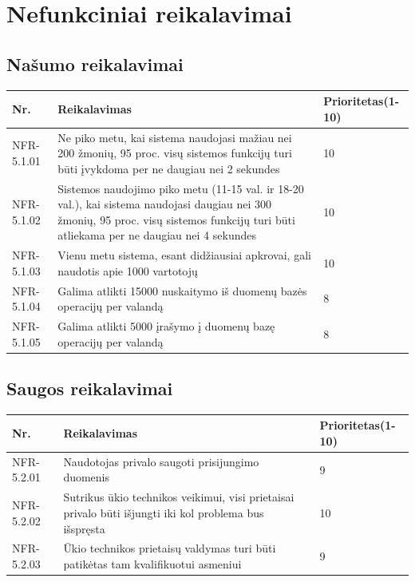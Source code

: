 \documentclass[oneside]{VUMIFPSkursinis}
\begin{document}
\section{Nefunkciniai reikalavimai}
\subsection{Našumo reikalavimai}
\begin{table}[htbp]
	\begin{tabularx}{1\textwidth}{ |P{2.5cm}|X|P{3cm }| }  \hline
		Nr. & Reikalavimas & Prioritetas(1-10) \\ \hline
		NFR-5.1.01 & Ne piko metu, kai sistema naudojasi mažiau nei 200 žmonių, 95 proc. visų sistemos funkcijų turi būti įvykdoma per ne daugiau nei 2 sekundes & 10 \\ \hline
		NFR-5.1.02 & Sistemos naudojimo piko metu (11-15 val. ir 18-20 val.), kai sistema naudojasi daugiau nei 300 žmonių, 95 proc. visų sistemos funkcijų turi būti atliekama per ne daugiau nei 4 sekundes & 10 \\ \hline
		NFR-5.1.03 & Vienu metu sistema, esant didžiausiai apkrovai, gali naudotis apie 1000 vartotojų & 10 \\ \hline
		NFR-5.1.04 & Galima atlikti 15000 nuskaitymo iš duomenų bazės operacijų per valandą & 8 \\ \hline
		NFR-5.1.05 & Galima atlikti 5000 įrašymo į duomenų bazę operacijų per valandą  & 8 \\ \hline
	\end{tabularx}
\end{table}
\subsection{Saugos reikalavimai}
\begin{table}[htbp]
	\begin{tabularx}{1\textwidth}{ |P{2.5cm}|X|P{3cm }| }  \hline
		Nr. & Reikalavimas & Prioritetas(1-10) \\ \hline
		NFR-5.2.01 & Naudotojas privalo saugoti prisijungimo duomenis & 9 \\ \hline
		NFR-5.2.02 & Sutrikus ūkio technikos veikimui, visi prietaisai privalo būti išjungti iki kol problema bus išspręsta & 10 \\ \hline
		NFR-5.2.03 & Ūkio technikos prietaisų valdymas turi būti patikėtas tam kvalifikuotui asmeniui & 9 \\ \hline
	\end{tabularx}
\end{table}
\pagebreak
\end{document}
